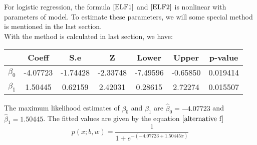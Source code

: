 \documentclass{article}
\begin{document}
    For logistic regression, the formula $\ref{ELF1}$ and $\ref{ELF2}$ is nonlinear with parameters of model. To estimate these parameters, we will some special method is mentioned in the last section. \\
    With the method is calculated in last section, we have: 
    \\ 
    \begin{center}
        \begin{tabular}{|c|c|c|c|c|c|c|}
        \hline
           & Coeff    & S.e      & Z        & Lower    & Upper    & p-value  \\ \hline
        $\beta_{0}$ & -4.07723 & {-1.74428} & -2.33748 & -7.49596 & -0.65850 & 0.019414 \\ \hline
        $\beta_{1}$ & 1.50445  & {0.62159}  & 2.42031  & 0.28615  & 2.72274  & 0.015507 \\ \hline
        \end{tabular}
    \end{center}
    The maximum likelihood estimates of $\beta_{0}$ and $\beta_{1}$ are $\hat\beta_{0} = -4.07723$ and $\hat\beta_{1} =  1.50445$. The fitted values are given by the equation $\ref{alternative f}$
    \begin{equation} 
         p(x; b, w) = \dfrac{1}{1 + e^{-(-4.07723 + 1.50445\dot x)}}
    \end{equation}
    
    \begin{center}
    \end{center}
    
\end{document}
